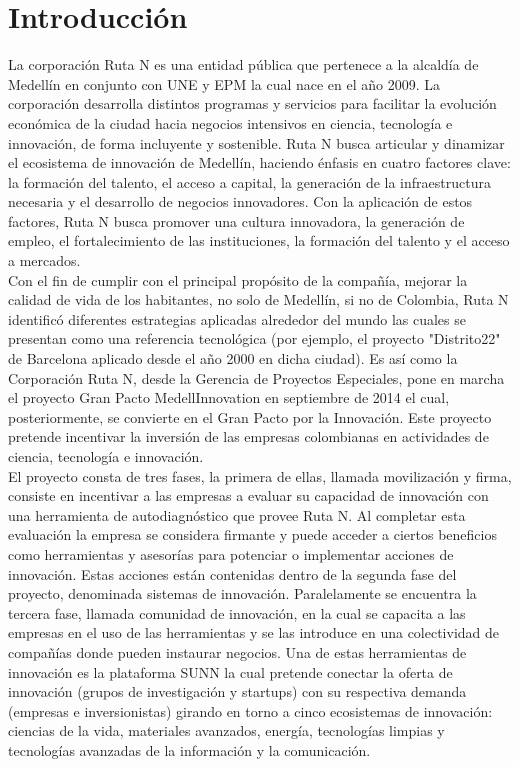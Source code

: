 \onehalfspacing
\chapter*{Introducción}
La  corporación   Ruta  N  es  una   entidad  pública  que pertenece  a  la  alcaldía  de  Medellín  en  conjunto  con  UNE y  EPM  la  cual  nace  en  el  año  2009. La  corporación desarrolla  distintos  programas  y  servicios  para  facilitar  la evolución económica de la ciudad hacia negocios intensivos en ciencia,  tecnología e innovación,  de forma incluyente y sostenible. Ruta N busca articular y dinamizar el ecosistema de  innovación  de  Medellín,   haciendo  énfasis  en  cuatro factores clave:  la formación del talento, el acceso a capital, la generación de la infraestructura necesaria y el desarrollo de  negocios  innovadores. Con  la  aplicación  de  estos
factores, Ruta N busca promover una cultura innovadora, la generación de empleo, el fortalecimiento de las instituciones, la formación del talento y el acceso a mercados.\\

Con  el  fin  de  cumplir  con  el  principal  propósito  de  la compañía,  mejorar la calidad de vida de los habitantes,  no solo de Medellín, si no de Colombia, Ruta N identificó diferentes  estrategias  aplicadas  alrededor  del  mundo  las  cuales se presentan como una referencia tecnológica (por ejemplo, el proyecto "Distrito22" de Barcelona aplicado desde el año 2000 en dicha ciudad).  Es así como la Corporación Ruta N, desde la Gerencia de Proyectos Especiales, pone en marcha el  proyecto  Gran  Pacto  MedellInnovation  en  septiembre
de  2014  el  cual,  posteriormente,  se  convierte  en  el  Gran Pacto por la Innovación.  Este proyecto pretende incentivar la inversión de las empresas colombianas en actividades de ciencia, tecnología e innovación.\\

El  proyecto  consta  de  tres  fases,  la  primera  de  ellas, llamada  movilización  y  firma,  consiste  en  incentivar  a  las empresas  a  evaluar  su  capacidad  de  innovación  con  una
herramienta  de  autodiagnóstico  que  provee  Ruta  N.  Al completar esta evaluación la empresa se considera firmante y  puede  acceder  a  ciertos  beneficios  como  herramientas y   asesorías   para   potenciar   o   implementar   acciones   de
innovación. Estas  acciones  están  contenidas  dentro  de la  segunda  fase  del  proyecto,   denominada  sistemas  de innovación.
Paralelamente  se  encuentra  la  tercera  fase,
llamada comunidad de innovación, en la cual se capacita a las empresas en el uso de las herramientas y se las introduce en  una  colectividad  de  compañías  donde  pueden  instaurar negocios.   Una  de  estas  herramientas  de  innovación  es  la
plataforma  SUNN  la  cual  pretende  conectar  la  oferta  de innovación  (grupos  de  investigación  y  startups)  con  su respectiva  demanda  (empresas  e  inversionistas)  girando  en torno  a  cinco  ecosistemas  de  innovación:   ciencias  de  la
vida,  materiales  avanzados,  energía,  tecnologías  limpias  y tecnologías avanzadas de la información y la comunicación.\\

